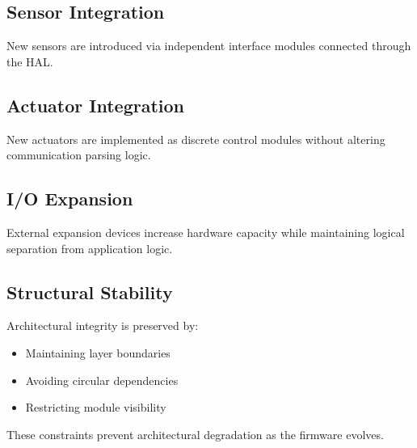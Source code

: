 \subsection{Sensor Integration}

New sensors are introduced via independent interface modules connected through the HAL.

\subsection{Actuator Integration}

New actuators are implemented as discrete control modules without altering communication parsing logic.

\subsection{I/O Expansion}

External expansion devices increase hardware capacity while maintaining logical separation from application logic.

\subsection{Structural Stability}

Architectural integrity is preserved by:

\begin{itemize}
	\item Maintaining layer boundaries
	\item Avoiding circular dependencies
	\item Restricting module visibility
\end{itemize}

These constraints prevent architectural degradation as the firmware evolves.